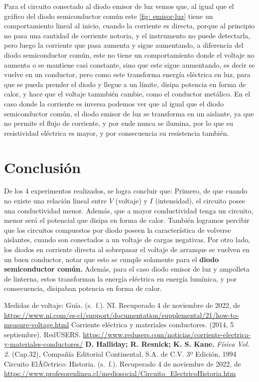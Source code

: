 \documentclass[]{article}
\begin{document}
Para el circuito conectado al diodo emisor de luz vemos que, al igual que el gráfico del diodo semiconductor común este \ref{fig: emisor-luz} tiene un comportamiento lineal al inicio, cuando la corriente es directa, porque al principio no pasa una cantidad de corriente notoria, y el instrumento no puede detectarla, pero luego la corriente que pasa aumenta y sigue aumentando, a diferencia del diodo semiconductor común, este no tiene un comportamiento donde el voltaje no aumenta o se mantiene casi constante, sino que este sigue aumentando, es decir se vuelve en un conductor, pero como este transforma energía eléctrica en luz, para que se pueda prender el diodo y llegue a un límite, disipa potencia en forma de calor, y hace que el voltaje tammbién cambie, como el conductor metálico. En el caso donde la corriente es inversa podemos ver que al igual que el diodo semiconductor común, el diodo emisor de luz se transforma en un aislante, ya que no permite el flujo de corriente, y por ende nunca se ilumina, por lo que su resistividad eléctrica es mayor, y por consecuencia su resistencia también. 



\section{Conclusión}
De los 4 experimentos realizados, se logra concluir que:
Primero, de que cuando no existe una relación lineal entre $V$ (voltaje) y $I$ (intensidad), el circuito posee una conductividad menor. Además, que a mayor conductividad tenga un circuito, menor será el potencial que disipa en forma de calor. 
También  logramos percibir que los circuitos compuestos por diodo poseen la característica de volverse aislantes, cuando son conectados a un voltaje de cargas negativas.
Por otro lado, los diodos en corriente directa al sobrepasar el voltaje de arranque se vuelven en un buen conductor, notar que esto se cumple
solamente para el \textbf{diodo semiconductor común.} Además, para el caso diodo emisor de luz y ampolleta de linterna, estos transforman la energía eléctrica en energía lumínica, y por consecuencia,
disipaban potencia en forma de calor.

\begin{thebibliography}{5}
   Medidas de voltaje: Guía. (s. f.). NI. Recuperado 4 de noviembre de 2022, 
  de \url{https://www.ni.com/es-cl/support/documentation/supplemental/21/how-to-measure-voltage.html}
  Corriente eléctrica y materiales conductores. (2014, 5 septiembre). RedUSERS. 
  \url{https://www.redusers.com/noticias/corriente-electrica-y-materiales-conductores/}
   \textbf{D. Halliday; R. Resnick; K. S. Kane.} \textit{Física Vol. 2.} (Cap.32), Compañía Editorial Continental, S.A. de C.V. 3º Edición, 1994
   Circuito ElÃ©ctrico: Historia. (s. f.). Recuperado 4 de noviembre de 2022,
   de \url{https://www.profesorenlinea.cl/mediosocial/Circuito_ElectricoHistoria.htm}
\end{thebibliography}
\end{document}
